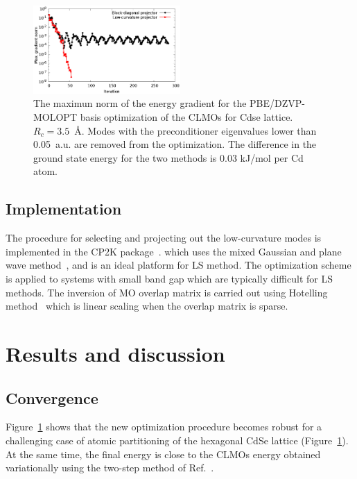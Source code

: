 \documentclass[aps,prl,twocolumn,reprint,amsmath,amssymb]{revtex4-1}
\begin{document}
\begin{figure}
\centering
\includegraphics[width=0.5\textwidth]{convergence}
\caption{The maximun norm of the energy gradient for the PBE/DZVP-MOLOPT basis optimization of the CLMOs for Cdse lattice. $R_c = 3.5$~{\AA}. Modes with the preconditioner eigenvalues lower than 0.05~a.u. are removed from the optimization. The difference in the ground state energy for the two methods is 0.03 kJ/mol per Cd atom.}
\label{fig:convergence}
\end{figure}

\subsection{Implementation}

The procedure for selecting and projecting out the low-curvature modes is implemented in the CP2K package~\cite{cp2kgeneral}. which uses the mixed Gaussian and plane wave method~\cite{vandevondele2005quickstep}, and is an ideal platform for LS method. The optimization scheme is applied to systems with small band gap which are typically difficult for LS methods. The inversion of MO overlap matrix is carried out using Hotelling method~\cite{hotelling1943some} which is linear scaling when the overlap matrix is sparse. 

\section{Results and discussion}

\subsection{Convergence}

Figure~\ref{fig:convergence} shows that the new optimization procedure becomes robust for a challenging case of atomic partitioning of the hexagonal CdSe lattice (Figure~\ref{fig:convergence}). At the same time, the final energy is close to the CLMOs energy obtained variationally using the two-step method of Ref.~\cite{khaliullin2013efficient}. 
\end{document}
